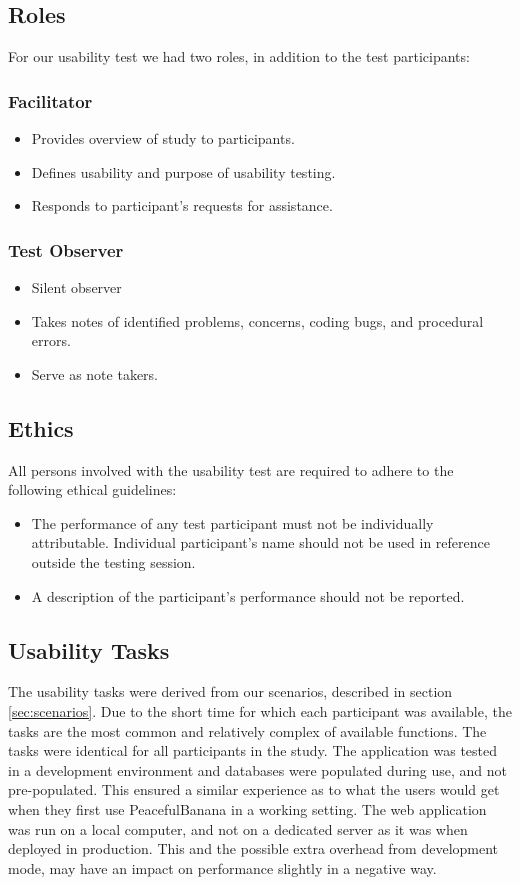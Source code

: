 \subsection{Roles}
For our usability test we had two roles, in addition to the test participants: \\
\subsubsection{Facilitator}
	\begin{itemize}
		\item Provides overview of study to participants.
		\item Defines usability and purpose of usability testing.
		\item Responds to participant's requests for assistance.
	\end{itemize}
\subsubsection{Test Observer}
	\begin{itemize}
		\item Silent observer
		\item Takes notes of identified problems, concerns, coding bugs, and procedural errors.
		\item Serve as note takers.
	\end{itemize}

\subsection{Ethics}
All persons involved with the usability test are required to adhere to the following ethical guidelines:
\begin{itemize}
	\item The performance of any test participant must not be individually attributable. Individual participant's name should not be used in reference outside the testing session.
	\item A description of the participant's performance should not be reported. 
\end{itemize}

\subsection{Usability Tasks}
The usability tasks were derived from our scenarios, described in section \ref{sec:scenarios}. Due to the short time for which each participant was available, the tasks are the most common and relatively complex of available functions. The tasks were identical for all participants in the study.
The application was tested in a development environment and databases were populated during use, and not pre-populated. This ensured a similar experience as to what the users would get when they first use PeacefulBanana in a working setting. The web application was run on a local computer, and not on a dedicated server as it was when deployed in production. This and the possible extra overhead from development mode, may have an impact on performance slightly in a negative way.

